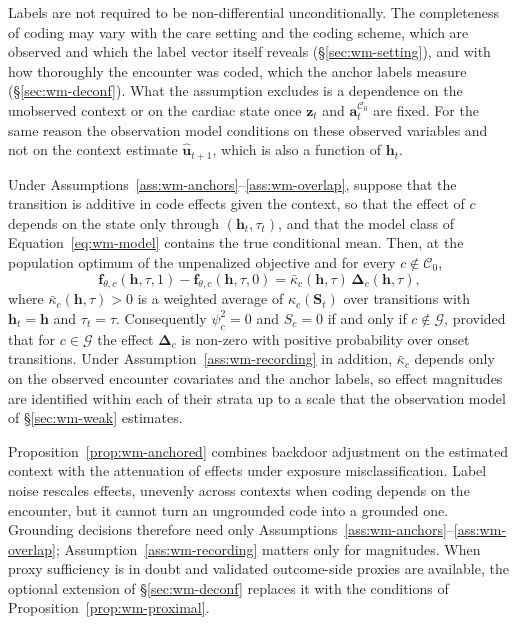 Labels are not required to be non-differential unconditionally. The completeness of coding may vary with the care setting and the coding scheme, which are observed and which the label vector itself reveals (\S\ref{sec:wm-setting}), and with how thoroughly the encounter was coded, which the anchor labels measure (\S\ref{sec:wm-deconf}). What the assumption excludes is a dependence on the unobserved context or on the cardiac state once $\mathbf{z}_t$ and $\mathbf{a}^{\mathcal{C}_0}_t$ are fixed. For the same reason the observation model conditions on these observed variables and not on the context estimate $\hat{\mathbf{u}}_{t+1}$, which is also a function of $\mathbf{h}_t$.

\begin{proposition}
\label{prop:wm-anchored}
Under Assumptions~\ref{ass:wm-anchors}--\ref{ass:wm-overlap}, suppose that the transition is additive in code effects given the context, so that the effect of $c$ depends on the state only through $(\mathbf{h}_t,\tau_t)$, and that the model class of Equation~\eqref{eq:wm-model} contains the true conditional mean. Then, at the population optimum of the unpenalized objective and for every $c\notin\mathcal{C}_0$,
\[
\mathbf{f}_{\theta,c}(\mathbf{h},\tau,1)-\mathbf{f}_{\theta,c}(\mathbf{h},\tau,0)=\bar{\kappa}_c(\mathbf{h},\tau)\,\boldsymbol{\Delta}_c(\mathbf{h},\tau),
\]
where $\bar{\kappa}_c(\mathbf{h},\tau)>0$ is a weighted average of $\kappa_c(\mathbf{S}_t)$ over transitions with $\mathbf{h}_t=\mathbf{h}$ and $\tau_t=\tau$. Consequently $\psi^{2}_c=0$ and $S_c=0$ if and only if $c\notin\mathcal{G}$, provided that for $c\in\mathcal{G}$ the effect $\boldsymbol{\Delta}_c$ is non-zero with positive probability over onset transitions. Under Assumption~\ref{ass:wm-recording} in addition, $\bar{\kappa}_c$ depends only on the observed encounter covariates and the anchor labels, so effect magnitudes are identified within each of their strata up to a scale that the observation model of \S\ref{sec:wm-weak} estimates.
\end{proposition}

Proposition~\ref{prop:wm-anchored} combines backdoor adjustment on the estimated context with the attenuation of effects under exposure misclassification. Label noise rescales effects, unevenly across contexts when coding depends on the encounter, but it cannot turn an ungrounded code into a grounded one. Grounding decisions therefore need only Assumptions~\ref{ass:wm-anchors}--\ref{ass:wm-overlap}; Assumption~\ref{ass:wm-recording} matters only for magnitudes. When proxy sufficiency is in doubt and validated outcome-side proxies are available, the optional extension of \S\ref{sec:wm-deconf} replaces it with the conditions of Proposition~\ref{prop:wm-proximal}.

